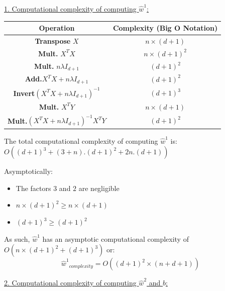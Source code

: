 \documentclass{homework}
\begin{document}
\underline{1. Computational complexity of computing $\hat{w}^1$:}

\begin{center}
\begin{tabular}{ | c | c | } 
\hline
\textbf{Operation} & \textbf{Complexity} (Big O Notation) \\
\hline
\textbf{Transpose} $X$ & $n\times(d+1)$ \\
\hline
\textbf{Mult.} $X^TX$ & $n\times(d+1)^2$ \\
\hline
\textbf{Mult.} $n\lambda I_{d+1}$ & $(d+1)^2$ \\
\hline
\textbf{Add.}$X^TX+n\lambda I_{d+1}$ & $(d+1)^2$ \\
\hline
\textbf{Invert}$(X^TX+n\lambda I_{d+1})^{-1}$ & $(d+1)^3$ \\
\hline
\textbf{Mult.} $X^TY$ &  $n\times(d+1)$ \\
\hline
\textbf{Mult.}$(X^TX+n\lambda I_{d+1})^{-1}X^TY$ & $(d+1)^2$ \\
\hline
\end{tabular}
\end{center}
The total computational complexity of computing $\hat{w}^1$ is: $O((d+1)^3+(3+n).(d+1)^2+2n.(d+1))$

Asymptotically:
\begin{itemize}
    \item The factors $3$ and $2$ are negligible
    \item $n\times(d+1)^2 \ge n\times(d+1)$
    \item $(d+1)^3 \ge (d+1)^2$
\end{itemize}

As such, $\hat{w}^1$ has an asymptotic computational complexity of $O(n\times(d+1)^2 + (d+1)^3)$ or:
$${\hat{w}^1}_{complexity}=O((d+1)^2\times(n+d+1))$$

\underline{2. Computational complexity of computing $\hat{w}^2$ and $b$:}
\end{document}
